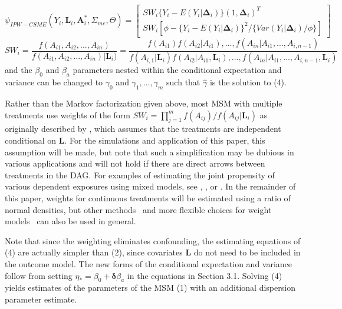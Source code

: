 \documentclass[useAMS,usenatbib,referee]{biom}
\begin{document}
\begin{equation}
    \psi_{IPW-CSME}(Y_{i}, \bm{L}_{i}, \bm{A}^{*}_{i}, \Sigma_{me}, \Theta) =
    \begin{bmatrix}
       SW_{i} \{ Y_{i} - E(Y_{i} | \bm{\Delta}_{i}) \} (1, \bm{\Delta}_{i})^{T} \\
       SW_{i} \left [ \phi - \{ Y_{i} - E(Y_{i} | \bm{\Delta}_{i})\}^{2} / \{ Var(Y_{i} | \bm{\Delta}_{i}) / \phi \} \right ]
    \end{bmatrix}
\end{equation}
\begin{equation}
SW_{i} = \frac{f(A_{i1}, A_{i2}, ..., A_{in})}{f(A_{i1}, A_{i2}, ..., A_{in}) | \bm{L}_{i})} = \frac{f(A_{i1})f(A_{i2} | A_{i1}), ..., f(A_{in} | A_{i1}, ..., A_{i,n-1})}{f(A_{i,1} | \bm{L}_{i})f(A_{i2} | A_{i1}, \bm{L}_{i}), ..., f(A_{in} | A_{i1}, ..., A_{i,n-1}, \bm{L}_{i})}
\end{equation}
and the $\beta_{0}$ and $\beta_{a}$ parameters nested within the conditional expectation and variance can be changed to $\gamma_{0}$ and $\gamma_{1},...,\gamma_{m}$ such that $\hat{\gamma}$ is the solution to (4).

Rather than the Markov factorization given above, most MSM with multiple treatments use weights of the form $SW_{i} = \prod_{j=1}^{m} f(A_{ij}) / f(A_{ij} | \bm{L}_{i})$ as originally described by \citet{hernan2001}, which assumes that the treatments are independent conditional on $\bm{L}$. For the simulations and application of this paper, this assumption will be made, but note that such a simplification may be dubious in various applications and will not hold if there are direct arrows between treatments in the DAG. For examples of estimating the joint propensity of various dependent exposures using mixed models, see \citet{tchetgen2012}, \citet{perez2014}, or \citet*{liu2016}. In the remainder of this paper, weights for continuous treatments will be estimated using a ratio of normal densities, but other methods~\citep{hirano2004} and more flexible choices for weight models~\citep{naimi2014} can also be used in general.

Note that since the weighting eliminates confounding, the estimating equations of (4) are actually simpler than (2), since covariates $\bm{L}$ do not need to be included in the outcome model. The new forms of the conditional expectation and variance follow from setting $\eta_{*} = \beta_{0} + \bm{\delta}\beta_{a}$ in the equations in Section 3.1. Solving (4) yields estimates of the parameters of the MSM (1) with an additional dispersion parameter estimate.
\end{document}
